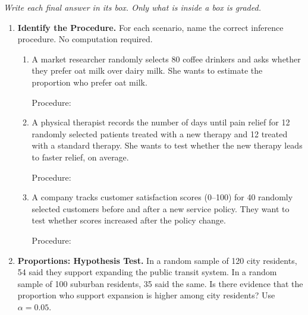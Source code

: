 \documentclass[10pt]{article}
\begin{document}
{\small\itshape Write each final answer in its box. Only what is inside a box is graded.}\par

\vspace{0.12in}

\begin{enumerate}

\item \textbf{Identify the Procedure.} \; For each scenario, name the correct inference
      procedure. No computation required.

\begin{enumerate}[label=\alph*.]
  \item A market researcher randomly selects 80 coffee drinkers and asks whether they prefer
        oat milk over dairy milk. She wants to estimate the proportion who prefer oat milk.

        Procedure: \makebox[9cm]{\smash{\gradedblank[id=hw1a, type=short, points=1, answer={{one-sample z-interval for p}}, check=text, display={\boldmath one-sample $z$-interval for $p$}]{8.8cm}{0.19in}}}

  \item A physical therapist records the number of days until pain relief for 12 randomly
        selected patients treated with a new therapy and 12 treated with a standard therapy.
        She wants to test whether the new therapy leads to faster relief, on average.

        Procedure: \makebox[9cm]{\smash{\gradedblank[id=hw1b, type=short, points=1, answer={{two-sample t-test for mu1 - mu2}}, check=text, display={\boldmath two-sample $t$-test for $\mu_1 - \mu_2$}]{8.8cm}{0.19in}}}

  \item A company tracks customer satisfaction scores (0--100) for 40 randomly selected
        customers before and after a new service policy. They want to test whether scores
        increased after the policy change.

        Procedure: \makebox[9cm]{\smash{\gradedblank[id=hw1c, type=short, points=1, answer={{matched-pairs t-test for mu_d}}, check=text, display={\boldmath matched-pairs $t$-test for $\mu_d$}]{8.8cm}{0.19in}}}
\end{enumerate}

\vspace{0.10in}

\item \textbf{Proportions: Hypothesis Test.} \;
      In a random sample of 120 city residents, 54 said they support expanding the public
      transit system. In a random sample of 100 suburban residents, 35 said the same.
      Is there evidence that the proportion who support expansion is higher among city
      residents? Use $\alpha = 0.05$.


\end{enumerate}
\end{document}
